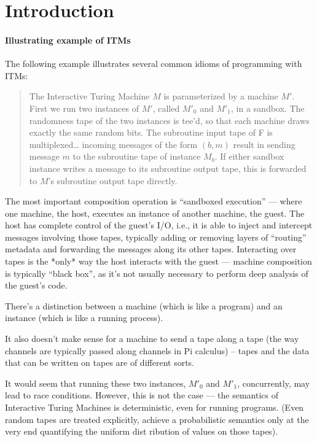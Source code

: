 \section{Introduction}

\paragraph{Illustrating example of ITMs}
The following example illustrates several common idioms of programming with ITMs:

\begin{quote}
    The Interactive Turing Machine $M$ is parameterized by a machine $M'$. First we run two instances of $M'$, called $M'_0$ and $M'_1$, in a sandbox. The randomness tape of the two instances is tee’d, so that each machine draws exactly the same random bits. The subroutine input tape of F is multiplexed… incoming messages of the form $(b, m)$ result in sending message $m$ to the subroutine tape of instance $M_b$. If either sandbox instance writes a message to its subroutine output tape, this is forwarded to $M$'s subroutine output tape directly.
\end{quote}

    The most important composition operation is “sandboxed execution” --- where one machine, the host, executes an instance of another machine, the guest. The host has complete control of the guest’s I/O, i.e., it is able to inject and intercept messages involving those tapes, typically adding or removing layers of “routing” metadata and forwarding the messages along its other tapes. Interacting over tapes is the *only* way the host interacts with the guest --- machine composition is typically “black box”, as it’s not usually necessary to perform deep analysis of the guest’s code.

    There’s a distinction between a machine (which is like a program) and an instance (which is like a running process).

 It also doesn’t make sense for a machine to send a tape along a tape (the way channels are typically passed along channels in Pi calculus) -- tapes and the data that can be written on tapes are of different sorts.

It would seem that running these two instances, $M'_0$ and $M'_1$, concurrently, may lead to race conditions. However, this is not the case --- the semantics of Interactive Turing Machines is deterministic, even for running programs. (Even random tapes are treated explicitly, achieve a probabilistic semantics only at the very end quantifying the uniform dist
ribution of values on those tapes).

